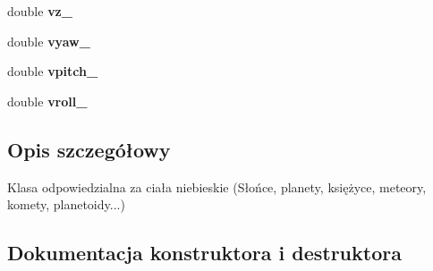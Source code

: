 \begin{DoxyCompactItemize}
\item 
double {\bfseries vz\+\_\+}\hypertarget{class_orb_a1179f690e6cbf52d4da73456730d36cd}{}\label{class_orb_a1179f690e6cbf52d4da73456730d36cd}

\item 
double {\bfseries vyaw\+\_\+}\hypertarget{class_orb_a83a8feef3eccee3b8977685c0228f855}{}\label{class_orb_a83a8feef3eccee3b8977685c0228f855}

\item 
double {\bfseries vpitch\+\_\+}\hypertarget{class_orb_abbc25532d1d10ad83e9fbd0f5c0c3d87}{}\label{class_orb_abbc25532d1d10ad83e9fbd0f5c0c3d87}

\item 
double {\bfseries vroll\+\_\+}\hypertarget{class_orb_a78b287c4625470fba356017276a8e300}{}\label{class_orb_a78b287c4625470fba356017276a8e300}

\end{DoxyCompactItemize}


\subsection{Opis szczegółowy}
Klasa odpowiedzialna za ciała niebieskie (Słońce, planety, księżyce, meteory, komety, planetoidy...) 

\subsection{Dokumentacja konstruktora i destruktora}
